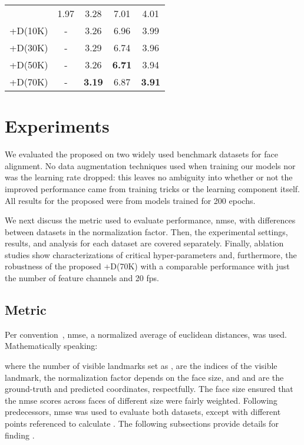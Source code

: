 \documentclass[10pt,twocolumn,letterpaper]{article}
\begin{document}
\begin{table}[t!]
{\begin{tabularx}{300pt}{l@{\hskip .25in}c@{\hskip .4in}ccc}
                                & 1.97                        & 3.28          & 7.01          & 4.01     			\tabularnewline
+D(10K)                         & -                           & 3.26          & 6.96          & 3.99            \tabularnewline
+D(30K)                         & -                           & 3.29          & 6.74          & 3.96              \tabularnewline
+D(50K)                         & -                           & 3.26          & \textbf{6.71} & 3.94              \tabularnewline
+D(70K)                         & -                           & \textbf{3.19} & 6.87          & \textbf{3.91}     \tabularnewline\bottomrule
    \end{tabularx}
  }
\end{table}
 \section{Experiments}

\label{sec:experiments}
We evaluated the proposed on two widely used benchmark datasets for face alignment. No data augmentation techniques used when training our models nor was the learning rate dropped: this leaves no ambiguity into whether or not the improved performance came from training tricks or the learning component itself. All results for the proposed were from models trained for 200 epochs.

We next discuss the metric used to evaluate performance, \gls{nmse}, with differences between datasets in the normalization factor. Then, the experimental settings, results, and analysis for each dataset are covered separately. Finally, ablation studies show characterizations of critical hyper-parameters and, furthermore, the robustness of the proposed +D(70K) with a comparable performance with just  the number of feature channels and 20 fps.



\subsection{Metric}
Per convention~\cite{bulat2017far, cristinacce2006feature, sagonas2013300}, \gls{nmse}, a normalized average of euclidean distances, was used. Mathematically speaking: 


where the number of visible landmarks set as ,  are the indices of the visible landmark, the normalization factor  depends on the face size, and  and  are the ground-truth and predicted coordinates, respectfully. The face size  ensured that the \gls{nmse} scores across faces of different size were fairly weighted. Following predecessors, \gls{nmse} was used to evaluate both datasets, except with different points referenced to calculate . The following subsections provide details for finding .
\end{document}
